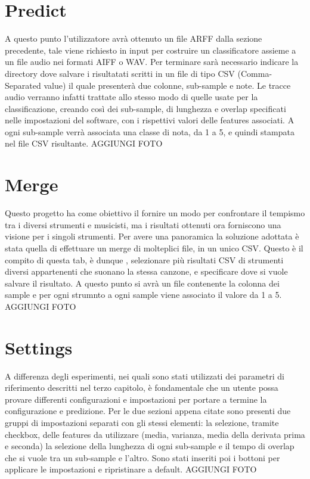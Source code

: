\section{Predict}
A questo punto l'utilizzatore avrà ottenuto un file ARFF dalla sezione precedente, tale viene richiesto in input per costruire un classificatore assieme a un file audio nei formati AIFF o WAV. Per terminare sarà necessario indicare la directory dove salvare i risultatati scritti in un file di tipo CSV (Comma-Separated value) il quale presenterà due colonne, sub-sample e note. Le tracce audio verranno infatti trattate allo stesso modo di quelle usate per la classificazione, creando così dei sub-sample, di lunghezza e overlap specificati nelle impostazioni del software, con i rispettivi valori delle features associati. A ogni sub-sample verrà associata una classe di nota, da 1 a 5, e quindi stampata nel file CSV risultante.
AGGIUNGI FOTO

\section{Merge}
Questo progetto ha come obiettivo il fornire un modo per confrontare il tempismo tra i diversi strumenti e musicisti, ma i risultati ottenuti ora forniscono una visione per i singoli strumenti. Per avere una panoramica la soluzione adottata è stata quella di effettuare un merge di molteplici file, in un unico CSV. Questo è il compito di questa tab, è dunque , selezionare più risultati CSV di strumenti diversi appartenenti che suonano la stessa canzone, e specificare dove si vuole salvare il risultato. A questo punto si avrà un file contenente la colonna dei sample e per ogni strumnto a ogni sample viene associato il valore da 1 a 5.
AGGIUNGI FOTO


\section{Settings}
A differenza degli esperimenti, nei quali sono stati utilizzati dei parametri di riferimento descritti nel terzo capitolo, è fondamentale che un utente possa provare differenti configurazioni e impostazioni per portare a termine la configurazione e predizione. Per le due sezioni appena citate sono presenti due gruppi di impostazioni separati con gli stessi elementi: la selezione, tramite checkbox, delle features da utilizzare (media, varianza, media della derivata prima e seconda) la selezione della lunghezza di ogni sub-sample e il tempo di overlap che si vuole tra un sub-sample e l'altro. Sono stati inseriti poi i bottoni per applicare le impostazioni e ripristinare a default.
AGGIUNGI FOTO